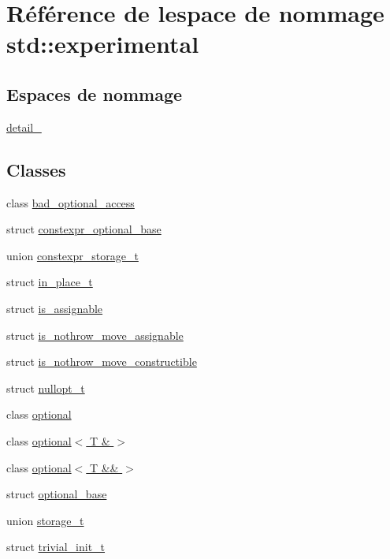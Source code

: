 \hypertarget{namespacestd_1_1experimental}{}\section{Référence de l\textquotesingle{}espace de nommage std\+:\+:experimental}
\label{namespacestd_1_1experimental}
\subsection*{Espaces de nommage}
\begin{DoxyCompactItemize}
\item 
 \hyperlink{namespacestd_1_1experimental_1_1detail__}{detail\+\_\+}
\end{DoxyCompactItemize}
\subsection*{Classes}
\begin{DoxyCompactItemize}
\item 
class \hyperlink{classstd_1_1experimental_1_1bad__optional__access}{bad\+\_\+optional\+\_\+access}
\item 
struct \hyperlink{structstd_1_1experimental_1_1constexpr__optional__base}{constexpr\+\_\+optional\+\_\+base}
\item 
union \hyperlink{unionstd_1_1experimental_1_1constexpr__storage__t}{constexpr\+\_\+storage\+\_\+t}
\item 
struct \hyperlink{structstd_1_1experimental_1_1in__place__t}{in\+\_\+place\+\_\+t}
\item 
struct \hyperlink{structstd_1_1experimental_1_1is__assignable}{is\+\_\+assignable}
\item 
struct \hyperlink{structstd_1_1experimental_1_1is__nothrow__move__assignable}{is\+\_\+nothrow\+\_\+move\+\_\+assignable}
\item 
struct \hyperlink{structstd_1_1experimental_1_1is__nothrow__move__constructible}{is\+\_\+nothrow\+\_\+move\+\_\+constructible}
\item 
struct \hyperlink{structstd_1_1experimental_1_1nullopt__t}{nullopt\+\_\+t}
\item 
class \hyperlink{classstd_1_1experimental_1_1optional}{optional}
\item 
class \hyperlink{classstd_1_1experimental_1_1optional_3_01_t_01_6_01_4}{optional$<$ T \& $>$}
\item 
class \hyperlink{classstd_1_1experimental_1_1optional_3_01_t_01_6_6_01_4}{optional$<$ T \&\& $>$}
\item 
struct \hyperlink{structstd_1_1experimental_1_1optional__base}{optional\+\_\+base}
\item 
union \hyperlink{unionstd_1_1experimental_1_1storage__t}{storage\+\_\+t}
\item 
struct \hyperlink{structstd_1_1experimental_1_1trivial__init__t}{trivial\+\_\+init\+\_\+t}
\end{DoxyCompactItemize}
